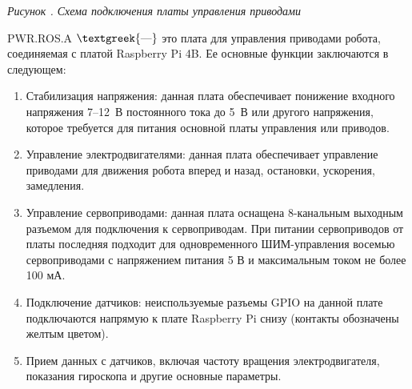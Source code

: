 \documentclass[a4paper]{article}
\newcounter{qwerty}
\renewcommand\theqwerty{\arabic{qwerty}}
\begin{document}


{\centering\itshape\color[HTML]{44546A}
Рисунок \stepcounter{qwerty}{\theqwerty}. Схема подключения платы управления приводами
\par}


\bigskip

PWR.ROS.A $\text{\textgreek{—}}$ это плата для управления приводами робота, соединяемая с платой
\foreignlanguage{english}{R}aspberry \foreignlanguage{english}{P}i 4B. Ее основные функции заключаются в следующем: 

\begin{enumerate}[series=listWWNumxxv,label=\arabic*.,ref=\arabic*]
\item Стабилизация напряжения: данная плата обеспечивает понижение входного напряжения 7–12\foreignlanguage{english}{ }В
постоянного тока до 5\foreignlanguage{english}{ }В или другого напряжения, которое требуется для питания основной платы
управления или приводов. 
\item Управление электродвигателями: данная плата обеспечивает управление приводами для движения робота вперед и назад,
остановки, ускорения, замедления.
\item Управление сервоприводами: данная плата оснащена 8-канальным выходным разъемом для подключения к сервоприводам.
При питании сервоприводов от платы последняя подходит для одновременного ШИМ-управления восемью сервоприводами с
напряжением питания 5 В и максимальным током не более 100 мА. 
\item Подключение датчиков: неиспользуемые разъемы GPIO на данной плате подключаются напрямую к плате
\foreignlanguage{english}{Raspberry} \foreignlanguage{english}{Pi} снизу (контакты обозначены желтым цветом).
\item Прием данных с датчиков, включая частоту вращения электродвигателя, показания гироскопа и другие основные
параметры.
\end{enumerate}
\end{document}

